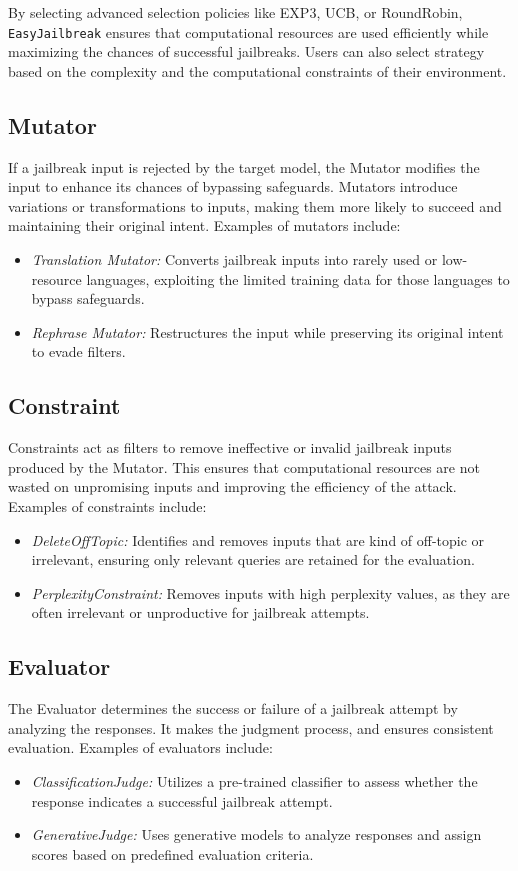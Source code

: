 \documentclass[18pt]{article}
\begin{document}
By selecting advanced selection policies like EXP3, UCB, or RoundRobin, \texttt{EasyJailbreak} ensures that computational resources are used efficiently while maximizing the chances of successful jailbreaks. Users can also select strategy based on the complexity and the computational constraints of their environment.

	
\subsection{Mutator}
If a jailbreak input is rejected by the target model, the Mutator modifies the input to enhance its chances of bypassing safeguards. Mutators introduce variations or transformations to inputs, making them more likely to succeed and maintaining their original intent. Examples of mutators include:
\begin{itemize}
    \item \textit{Translation Mutator:} Converts jailbreak inputs into rarely used or low-resource languages, exploiting the limited training data for those languages to bypass safeguards.
    \item \textit{Rephrase Mutator:} Restructures the input while preserving its original intent to evade filters.
\end{itemize}

\subsection{Constraint}
Constraints act as filters to remove ineffective or invalid jailbreak inputs produced by the Mutator. This ensures that computational resources are not wasted on unpromising inputs and improving the efficiency of the attack. Examples of constraints include:
\begin{itemize}
    \item \textit{DeleteOffTopic:} Identifies and removes inputs that are kind of off-topic or irrelevant, ensuring only relevant queries are retained for the evaluation.
    \item \textit{PerplexityConstraint:} Removes inputs with high perplexity values, as they are often irrelevant or unproductive for jailbreak attempts.
\end{itemize}

\subsection{Evaluator}
The Evaluator determines the success or failure of a jailbreak attempt by analyzing the responses. It makes the judgment process, and ensures consistent evaluation. Examples of evaluators include:
\begin{itemize}
    \item \textit{ClassificationJudge:} Utilizes a pre-trained classifier to assess whether the response indicates a successful jailbreak attempt.
    \item \textit{GenerativeJudge:} Uses generative models to analyze responses and assign scores based on predefined evaluation criteria.
\end{itemize}
\end{document}
